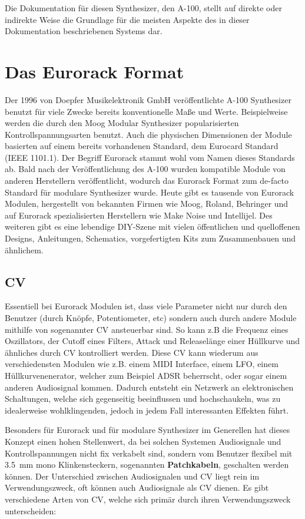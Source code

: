 Die Dokumentation für diesen Synthesizer, den A-100, stellt auf direkte oder indirekte Weise die Grundlage für die meisten Aspekte des in dieser Dokumentation beschriebenen Systems dar.

\section{Das Eurorack Format}
\label{sec:org7e9c7bb}

Der 1996 von Doepfer Musikelektronik GmbH veröffentlichte A-100 Synthesizer benutzt für viele Zwecke bereits konventionelle Maße und Werte. Beispielweise werden die durch den Moog Modular Synthesizer popularisierten Kontrollspannungsarten benutzt. Auch die physischen Dimensionen der Module basierten auf einem bereits vorhandenen Standard, dem Eurocard Standard (IEEE 1101.1). Der Begriff Eurorack stammt wohl vom Namen dieses Standards ab. Bald nach der Veröffentlichung des A-100 wurden kompatible Module von anderen Herstellern veröffentlicht, wodurch das Eurorack Format zum de-facto Standard für modulare Synthesizer wurde. Heute gibt es tausende von Eurorack Modulen, hergestellt von bekannten Firmen wie Moog, Roland, Behringer und auf Eurorack spezialisierten Herstellern wie Make Noise und Intellijel. Des weiteren gibt es eine lebendige DIY-Szene mit vielen öffentlichen und quelloffenen Designs, Anleitungen, Schematics, vorgefertigten Kits zum Zusammenbauen und ähnlichem.

\subsection{\acf{CV} \label{CV}}
\label{sec:org05ca5eb}
Essentiell bei Eurorack Modulen ist, dass viele Parameter nicht nur durch den Benutzer (durch Knöpfe, Potentiometer, etc) sondern auch durch andere Module mithilfe von sogenannter \acl{CV} ansteuerbar sind. So kann z.B die Frequenz eines Oszillators, der Cutoff eines Filters, Attack und Releaselänge einer Hüllkurve und ähnliches durch \acl{CV} kontrolliert werden. Diese \acl{CV} kann wiederum aus verschiedensten Modulen wie z.B. einem MIDI Interface, einem \ac{LFO}, einem Hüllkurvenenerator, welcher zum Beispiel \ac{ADSR} beherrscht, oder sogar einem anderen Audiosignal kommen. Dadurch entsteht ein Netzwerk an elektronischen Schaltungen, welche sich gegenseitig beeinflussen und hochschaukeln, was zu idealerweise wohlklingenden, jedoch in jedem Fall interessanten Effekten führt.

Besonders für Eurorack und für modulare Synthesizer im Generellen hat dieses Konzept einen hohen Stellenwert, da bei solchen Systemen Audiosignale und Kontrollspannungen nicht fix verkabelt sind, sondern vom Benutzer flexibel mit \SI{3.5}{\milli\meter} mono Klinkensteckern, sogenannten \textbf{Patchkabeln}, geschalten werden können. Der Unterschied zwischen Audiosignalen und \acl{CV} liegt rein im Verwendungszweck, oft können auch Audiosignale als \acl{CV} dienen. Es gibt verschiedene Arten von \acl{CV}, welche sich primär durch ihren Verwendungszweck unterscheiden:


